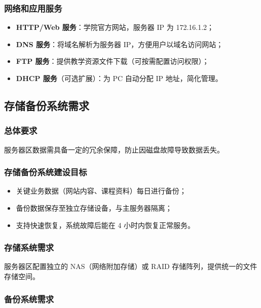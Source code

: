 \documentclass[12pt,a4paper]{ctexart}
\begin{document}
\subsubsection{网络和应用服务}

\begin{itemize}
  \item \textbf{HTTP/Web 服务}：学院官方网站，服务器 IP 为 172.16.1.2；
  \item \textbf{DNS 服务}：将域名解析为服务器 IP，方便用户以域名访问网站；
  \item \textbf{FTP 服务}：提供教学资源文件下载（可按需配置访问权限）；
  \item \textbf{DHCP 服务}（可选扩展）：为 PC 自动分配 IP 地址，简化管理。
\end{itemize}

\subsection{存储备份系统需求}

\subsubsection{总体要求}

服务器区数据需具备一定的冗余保障，防止因磁盘故障导致数据丢失。

\subsubsection{存储备份系统建设目标}

\begin{itemize}
  \item 关键业务数据（网站内容、课程资料）每日进行备份；
  \item 备份数据保存至独立存储设备，与主服务器隔离；
  \item 支持快速恢复，系统故障后能在 4 小时内恢复正常服务。
\end{itemize}

\subsubsection{存储系统需求}

服务器区配置独立的 NAS（网络附加存储）或 RAID 存储阵列，提供统一的文件存储空间。

\subsubsection{备份系统需求}
\end{document}
